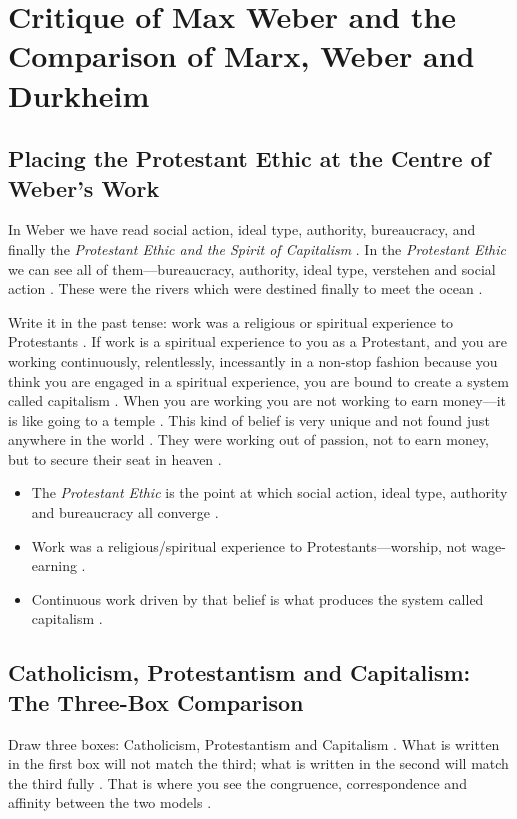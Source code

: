 \sectiondivider

\section{Critique of Max Weber and the Comparison of Marx, Weber and Durkheim}

\subsection{Placing the Protestant Ethic at the Centre of Weber's Work}
In Weber we have read social action, ideal type, authority, bureaucracy, and finally the \textit{Protestant Ethic and the Spirit of Capitalism} . In the \textit{Protestant Ethic} we can see all of them---bureaucracy, authority, ideal type, verstehen and social action . These were the rivers which were destined finally to meet the ocean .

\begin{KeyConcept}
Write it in the past tense: work was a religious or spiritual experience to Protestants .
If work is a spiritual experience to you as a Protestant, and you are working continuously, relentlessly, incessantly in a non-stop fashion because you think you are engaged in a spiritual experience, you are bound to create a system called capitalism .
When you are working you are not working to earn money---it is like going to a temple . This kind of belief is very unique and not found just anywhere in the world .
They were working out of passion, not to earn money, but to secure their seat in heaven .
\end{KeyConcept}

\begin{QuickRevision}
\begin{itemize}
    \item The \textit{Protestant Ethic} is the point at which social action, ideal type, authority and bureaucracy all converge .
    \item Work was a religious/spiritual experience to Protestants---worship, not wage-earning .
    \item Continuous work driven by that belief is what produces the system called capitalism .
\end{itemize}
\end{QuickRevision}

\subsection{Catholicism, Protestantism and Capitalism: The Three-Box Comparison}
Draw three boxes: Catholicism, Protestantism and Capitalism . What is written in the first box will not match the third; what is written in the second will match the third fully . That is where you see the congruence, correspondence and affinity between the two models .

